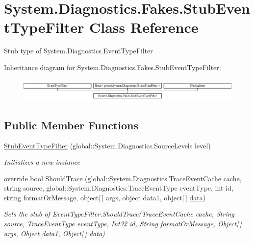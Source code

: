 \hypertarget{class_system_1_1_diagnostics_1_1_fakes_1_1_stub_event_type_filter}{\section{System.\-Diagnostics.\-Fakes.\-Stub\-Event\-Type\-Filter Class Reference}
\label{class_system_1_1_diagnostics_1_1_fakes_1_1_stub_event_type_filter}
}


Stub type of System.\-Diagnostics.\-Event\-Type\-Filter 


Inheritance diagram for System.\-Diagnostics.\-Fakes.\-Stub\-Event\-Type\-Filter\-:\begin{figure}[H]
\begin{center}
\leavevmode
\includegraphics[height=1.196581cm]{class_system_1_1_diagnostics_1_1_fakes_1_1_stub_event_type_filter}
\end{center}
\end{figure}
\subsection*{Public Member Functions}
\begin{DoxyCompactItemize}
\item 
\hyperlink{class_system_1_1_diagnostics_1_1_fakes_1_1_stub_event_type_filter_a7705c7e651df5223de6fe0ee8217740b}{Stub\-Event\-Type\-Filter} (global\-::\-System.\-Diagnostics.\-Source\-Levels level)
\begin{DoxyCompactList}\small\item\em Initializes a new instance\end{DoxyCompactList}\item 
override bool \hyperlink{class_system_1_1_diagnostics_1_1_fakes_1_1_stub_event_type_filter_a590cb565ddf0fb1dbb3a6366f9f1bbbe}{Should\-Trace} (global\-::\-System.\-Diagnostics.\-Trace\-Event\-Cache \hyperlink{jquery-1_810_82-vsdoc_8js_acdb445beb9aa4c6dbdf28258e18dbb58}{cache}, string source, global\-::\-System.\-Diagnostics.\-Trace\-Event\-Type event\-Type, int id, string format\-Or\-Message, object\mbox{[}$\,$\mbox{]} args, object data1, object\mbox{[}$\,$\mbox{]} \hyperlink{jquery-1_810_82-vsdoc_8js_a609407b3456fdc3c5671a9fc4a226ff7}{data})
\begin{DoxyCompactList}\small\item\em Sets the stub of Event\-Type\-Filter.\-Should\-Trace(\-Trace\-Event\-Cache cache, String source, Trace\-Event\-Type event\-Type, Int32 id, String format\-Or\-Message, Object\mbox{[}$\,$\mbox{]} args, Object data1, Object\mbox{[}$\,$\mbox{]} data)\end{DoxyCompactList}\end{DoxyCompactItemize}
